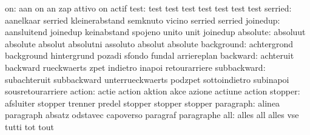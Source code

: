                        on: aan                       on
                           an                        zap
                           attivo                    on
                           actif
                     test: test                      test
                           test                      test
                           test                      test
                           test
                  serried: aanelkaar                 serried
                           kleinerabstand            semknuto
                           vicino                    serried
                           serried
                 joinedup: aansluitend               joinedup
                           keinabstand               spojeno
                           unito                     unit
                           joinedup
                 absolute: absoluut                  absolute
                           absolut                   absolutni
                           assoluto                  absolut
                           absolute
               background: achtergrond               background
                           hintergrund               pozadi
                           sfondo                    fundal
                           arriereplan
                 backward: achteruit                 backward
                           rueckwaerts               zpet
                           indietro                  inapoi
                           retourarriere
              subbackward: subachteruit              subbackward
                           unterrueckwaerts          podzpet
                           sottoindietro             subinapoi
                           sousretourarriere
                   action: actie                     action
                           aktion                    akce
                           azione                    actiune
                           action
                  stopper: afsluiter                 stopper
                           trenner                   predel
                           stopper                   stopper
                           stopper
                paragraph: alinea                    paragraph
                           absatz                    odstavec
                           capoverso                 paragraf
                           paragraphe
                      all: alles                     all
                           alles                     vse
                           tutti                     tot
                           tout
